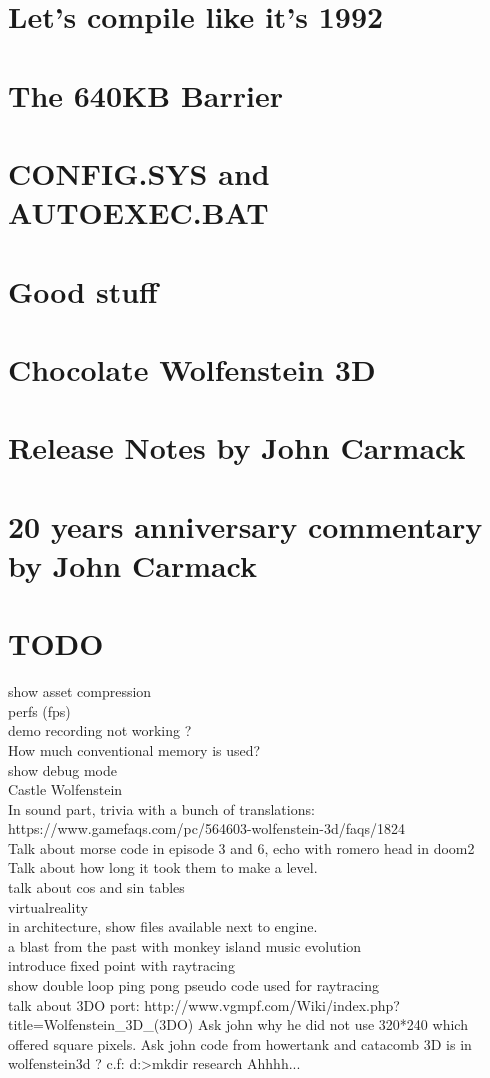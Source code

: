 \documentclass[8pt]{book}
\begin{document}
    \chapter{Let's compile like it's 1992}
    \chapter{The 640KB Barrier}\label{chap:barrier640}
        
    \chapter{CONFIG.SYS and AUTOEXEC.BAT}
         
    \chapter{Good stuff}
          
    \chapter{Chocolate Wolfenstein 3D}
    \chapter{Release Notes by John Carmack}
        
    \chapter{20 years anniversary commentary by John Carmack}
        
    
    
    \chapter{TODO}
    
    show asset compression\\
    perfs (fps)\\
demo recording not working ?\\
How much conventional memory is used?\\
show debug mode\\
Castle Wolfenstein\\
In sound part, trivia with a bunch of translations: https://www.gamefaqs.com/pc/564603-wolfenstein-3d/faqs/1824\\
Talk about morse code in episode 3 and 6, echo with romero head in doom2\\
Talk about how long it took them to make a level.\\
talk about cos and sin tables\\
virtualreality\\
in architecture, show files available next to engine.\\
a blast from the past with monkey island music evolution\\
introduce fixed point with raytracing\\
show double loop ping pong pseudo code used for raytracing\\
talk about 3DO port: http://www.vgmpf.com/Wiki/index.php?title=Wolfenstein\_3D\_(3DO)
Ask john why he did not use 320*240 which offered square pixels.
Ask john code from howertank and catacomb 3D is in wolfenstein3d ? c.f: d:>mkdir research Ahhhh...

\end{document}

